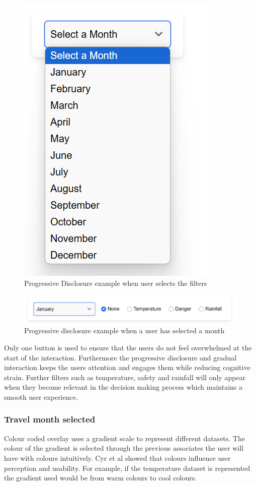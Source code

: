 \documentclass[]{project_final}
\begin{document}
\begin{figure}[ht!]
  \centering
  \includegraphics[width=.5\textwidth]{2.png}
  \caption{Progressive Disclosure example when user selects the filters}
  \label{fig:1}
\end{figure}

\begin{figure}[ht!]
  \centering
  \includegraphics[width=\textwidth]{3.png}
  \caption{Progressive disclosure example when a user has selected a month}
  \label{fig:1}
\end{figure}

Only one button is used to ensure that the users do not feel overwhelmed at the start of the interaction. Furthermore the progressive disclosure and gradual interaction keeps the users attention and engages them while reducing cognitive strain. Further filters such as temperature, safety and rainfall will only appear when they become relevant in the decision making process which maintains a smooth user experience.

\subsubsection{Travel month selected}

Colour coded overlay uses a gradient scale to represent different datasets. The colour of the gradient is selected through the previous associates the user will have with colours intuitively. Cyr et al showed that colours influence user perception and usability. For example, if the temperature dataset is represented the gradient used would be from warm colours to cool colours.
\end{document}
